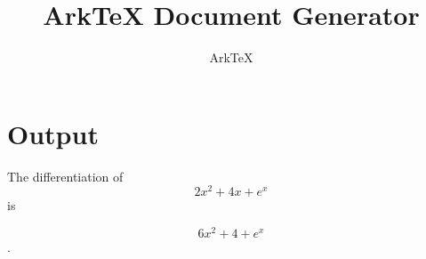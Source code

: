 \documentclass[dvips, 12pt, twoside]{article}
\begin{document}
\title{ArkTeX Document Generator}
\author{ArkTeX}
\maketitle

\medskip

\section*{Output}
\begin{LARGE}
 The differentiation of $$2x^2 + 4x + e^{x} $$ is 

$$ 6x^2 + 4 + e^{x} $$ .
\end{LARGE}
\end{document}
